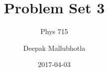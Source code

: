 \documentclass[11pt]{article}
\title{Problem Set 3}
\subtitle{Phys 715}
\date{2017-04-03}
\author{Deepak Mallubhotla}
\newcommand{\onlyinsubfile}[1]{#1}
\newcommand{\notinsubfile}[1]{}
\begin{document}
\renewcommand{\onlyinsubfile}[1]{}
\renewcommand{\notinsubfile}[1]{#1}


\maketitle













\end{document}
